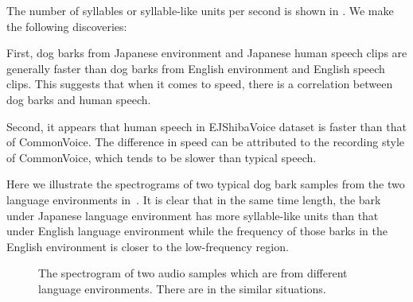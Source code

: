 The number of syllables or syllable-like units per second is shown 
in .  We make the following discoveries: 

First, dog barks from Japanese environment and Japanese human speech clips 
are generally faster than dog barks from English environment and English speech clips. 
This suggests that when it comes to speed, there is a correlation between dog barks
and human speech. %

Second, it appears that human speech in EJShibaVoice dataset is faster than
that of CommonVoice.  %
The difference in speed can be attributed to the 
recording style of CommonVoice, which tends to be slower than typical speech.

Here we illustrate the spectrograms of two typical dog bark samples from the 
two language environments in~. 
It is clear that in the same time length, the bark under Japanese language environment has more syllable-like units than that under English language environment while the frequency of those barks 
in the English environment is closer to the low-frequency region.

\begin{figure}[ht]
	\centering
	
	
	\caption{The spectrogram of two audio samples which are from different language environments. There are in the similar situations.}
	\label{Fig.sample}
\end{figure}

